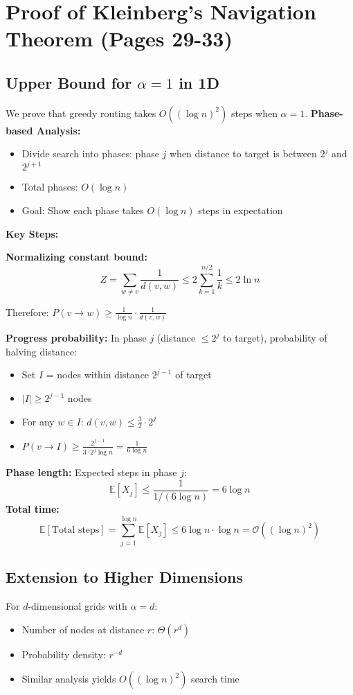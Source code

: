 \documentclass[11pt,a4paper]{article}
\theoremstyle{definition}
\begin{document}
\section{Proof of Kleinberg's Navigation Theorem (Pages 29-33)}
\subsection{Upper Bound for $\alpha = 1$ in 1D}
We prove that greedy routing takes $O((\log n)^2)$ steps when $\alpha = 1$.
\textbf{Phase-based Analysis:}
\begin{itemize}
\item Divide search into phases: phase $j$ when distance to target is between $2^j$ and $2^{j+1}$
\item Total phases: $O(\log n)$
\item Goal: Show each phase takes $O(\log n)$ steps in expectation
\end{itemize}
\textbf{Key Steps:}

\textbf{Normalizing constant bound:}
$$
Z = \sum_{w\neq v} \frac{1}{d(v,w)}\le 2\sum_{k=1}^{n/2} \frac{1}{k}\le 2\ln n
$$

Therefore: $P(v \rightarrow w) \geq \frac{1}{\log n} \cdot \frac{1}{d(v,w)}$

\textbf{Progress probability:}
In phase $j$ (distance $\leq 2^j$ to target), probability of halving distance:
\begin{itemize}
\item Set $I$ = nodes within distance $2^{j-1}$ of target
\item $|I| \geq 2^{j-1}$ nodes
\item For any $w \in I$: $d(v,w) \leq \frac{3}{2} \cdot 2^j$
\item $P(v \rightarrow I) \geq \frac{2^{j-1}}{3 \cdot 2^j \log n} = \frac{1}{6\log n}$
\end{itemize}
\textbf{Phase length:}
Expected steps in phase $j$:
$$
\mathbb{E}[X_j]\le \frac{1}{1/(6\log n)}=6\log n
$$
\textbf{Total time:}
$$
\mathbb{E}[\text{Total steps}] = \sum_{j=1}^{\log n} \mathbb{E}[X_j]\le 6\log n\cdot \log n = \mathcal{O}((\log n)^2)
$$

\subsection{Extension to Higher Dimensions}
For $d$-dimensional grids with $\alpha = d$:
\begin{itemize}
\item Number of nodes at distance $r$: $\Theta(r^d)$
\item Probability density: $r^{-d}$
\item Similar analysis yields $O((\log n)^2)$ search time
\end{itemize}
\end{document}
